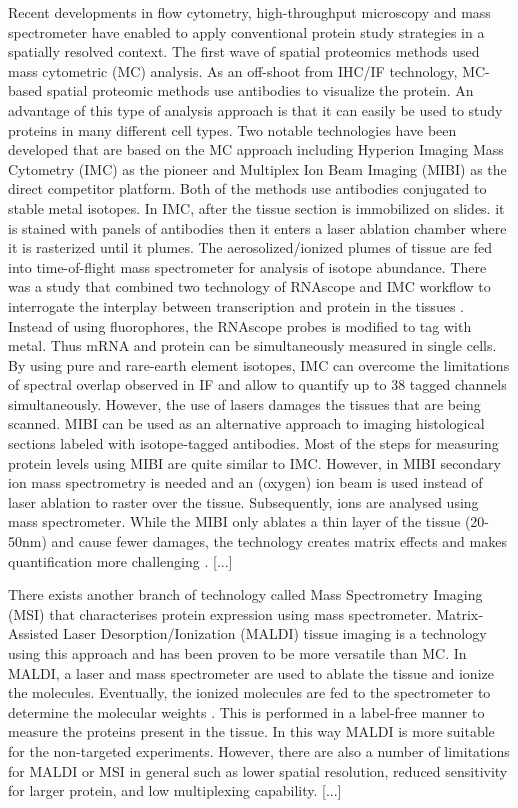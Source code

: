 Recent developments in flow cytometry, high-throughput microscopy and mass spectrometer have enabled to apply conventional protein study strategies in a spatially resolved context. The first wave of spatial proteomics methods used mass cytometric (MC) analysis. As an off-shoot from IHC/IF technology, MC-based spatial proteomic methods use antibodies to visualize the protein. An advantage of this type of analysis approach is that it can easily be used to study proteins in many different cell types. Two notable technologies have been developed that are based on the MC approach including Hyperion Imaging Mass Cytometry (IMC) as the pioneer and Multiplex Ion Beam Imaging (MIBI) as the direct competitor platform. Both of the methods use antibodies conjugated to stable metal isotopes. In IMC, after the tissue section is immobilized on slides. it is stained with panels of antibodies then it enters a laser ablation chamber where it is rasterized until it plumes. The aerosolized/ionized plumes of tissue are fed into time-of-flight mass spectrometer for analysis of isotope abundance.  There was a study that combined two technology of RNAscope and IMC workflow to interrogate the interplay between transcription and protein in the tissues \cite{schulz2018simultaneous}. Instead of using fluorophores, the RNAscope probes is modified to tag with metal. Thus mRNA and protein can be simultaneously measured in single cells. By using pure and rare-earth element isotopes, IMC can overcome the limitations of spectral overlap observed in IF and allow to quantify up to 38 tagged channels simultaneously. However, the use of lasers damages the tissues that are being scanned. MIBI can be used as an alternative approach to imaging histological sections labeled with isotope-tagged antibodies. Most of the steps for measuring protein levels using MIBI are quite similar to IMC. However, in MIBI secondary ion mass spectrometry is needed and  an (oxygen) ion beam is used instead of laser ablation to raster over the tissue. Subsequently, ions are analysed using mass spectrometer. While the MIBI only ablates a thin layer of the tissue (20-50nm) and cause fewer damages, the technology creates matrix effects and makes quantification more challenging \cite{bodenmiller2016multiplexed}. [...]

There exists another branch of technology called Mass Spectrometry Imaging (MSI) that characterises protein expression using mass spectrometer. Matrix‐Assisted Laser Desorption/Ionization (MALDI) tissue imaging is a technology using this approach and has been proven to be more versatile than MC. In MALDI, a laser and mass spectrometer are used to ablate the tissue and ionize the molecules. Eventually, the ionized molecules are fed to the spectrometer to determine the molecular weights \cite{caprioli1997molecular}.  This is performed in a label-free manner to measure the proteins present in the tissue. In this way MALDI is more suitable for the non-targeted experiments. However, there are also a number of limitations for MALDI or MSI in general such as lower spatial resolution, reduced sensitivity for larger protein, and low multiplexing capability. [...]

